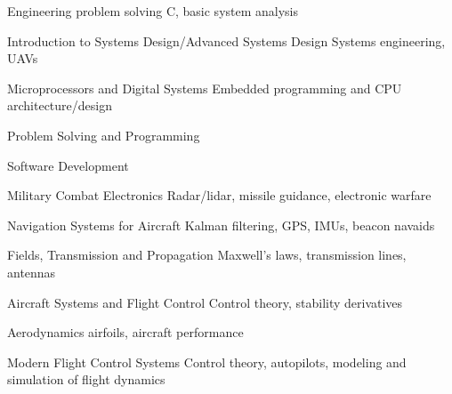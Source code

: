 \documentclass[letterpaper]{article}
\renewenvironment{itemize}{
  \begin{list}{}{
    \setlength{\leftmargin}{1.5em}
  }
}{
  \end{list}
}
\begin{document}
\begin{itemize}
\item Engineering problem solving \textemdash{} C, basic system analysis
\item Introduction to Systems Design/Advanced Systems Design \textemdash{} Systems engineering, UAVs
\item Microprocessors and Digital Systems \textemdash{} Embedded programming and CPU architecture/design
\item Problem Solving and Programming
\item Software Development
\item Military Combat Electronics \textemdash{} Radar/lidar, missile guidance, electronic warfare
\item Navigation Systems for Aircraft \textemdash{} Kalman filtering, GPS, IMUs, beacon navaids
\item Fields, Transmission and Propagation \textemdash{} Maxwell’s laws, transmission lines, antennas
\item Aircraft Systems and Flight Control \textemdash{} Control theory, stability derivatives
\item Aerodynamics \textemdash{} airfoils, aircraft performance
\item Modern Flight Control Systems \textemdash{} Control theory, autopilots, modeling and simulation of flight dynamics
\end{itemize}
\end{document}
